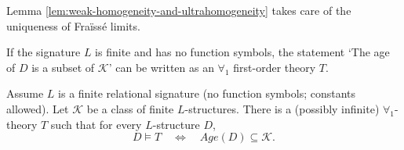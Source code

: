 Lemma \ref{lem:weak-homogeneity-and-ultrahomogeneity} takes care of the uniqueness of Fraïssé limits.

If the signature \(L\) is finite and has no function symbols, the statement ‘The age of \(D\) is a subset of \(\mathcal{K}\)’ can be written as an \(\forall_1\) first-order theory \(T\).


\begin{lemma}\label{lem:forall1}
    Assume $L$ is a finite relational signature (no function symbols; constants allowed).
    Let $\mathcal K$ be a class of finite $L$-structures. There is a (possibly infinite)
    $\forall_1$-theory $T$ such that for every $L$-structure $D$,
    \[
        D\models T \quad\Longleftrightarrow\quad Age(D)\subseteq \mathcal K.
    \]
\end{lemma}

